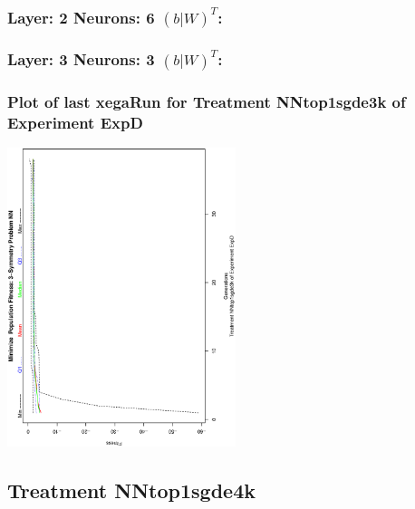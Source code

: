 \documentclass[18pt,c]{beamer}
\makeatletter
\def\beamer@writeslidentry@miniframesoff{%
  \expandafter\beamer@ifempty\expandafter{\beamer@framestartpage}{}%
  {%
   \clearpage\beamer@notesactions%
  }
}
\newcommand*{\miniframesoff}{\let\beamer@writeslidentry=\beamer@writeslidentry@miniframesoff}
\makeatother
\begin{document}

 \begin{frame}
 \fontsize{8pt}{9pt}\selectfont
 \frametitle{ Layer: 2 Neurons: 6  $(b|W)^T$: 
 }

 \label{ExpDNNWeightTable019.tex}  
 \end{frame}


 \begin{frame}
 \fontsize{8pt}{9pt}\selectfont
 \frametitle{ Layer: 3 Neurons: 3  $(b|W)^T$: 
 }

 \label{ExpDNNWeightTable020.tex}  
 \end{frame}

 \begin{frame}
 \frametitle{ Plot of last xegaRun for Treatment NNtop1sgde3k of Experiment ExpD }
 \begin{center}
\includegraphics[width=0.5\textwidth, angle=-90]
{ExpDPlotPopStatsFigure006.eps}
 \end{center}
 \label{report/ExpDPlotPopStatsFigure006.eps}  
 \end{frame}

\miniframesoff
\subsection{Treatment NNtop1sgde4k}
\end{document}
